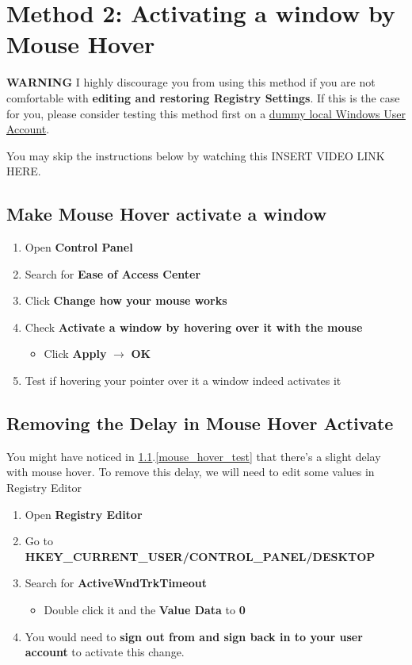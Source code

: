 \documentclass{article}
\begin{document}
\section{Method 2: Activating a window by Mouse Hover}
\label{section: method2}

\textbf{WARNING} I highly discourage you from using this method if you are not comfortable with \textbf{editing and restoring Registry Settings}. If this is the case for you, please consider testing this method first on a \href{https://support.microsoft.com/en-us/help/4026923/windows-10-create-a-local-user-or-administrator-account}{dummy local Windows User Account}. 

You may skip the instructions below by watching this INSERT VIDEO LINK HERE. 

\subsection{Make Mouse Hover activate a window}
\label{subsection: mouse_hover_enable}
\begin{enumerate}
   \item Open \textbf{Control Panel}
   \item Search for \textbf{Ease of Access Center}
   \item Click \textbf{Change how your mouse works}
   \item Check \textbf{Activate a window by hovering over it with the mouse}
   \begin{itemize}
     \item Click \textbf{Apply} $\rightarrow$ \textbf{OK}
   \end{itemize}
   \item Test if hovering your pointer over it a window indeed activates it
   \label{mouse_hover_test}
\end{enumerate}

\subsection{Removing the Delay in Mouse Hover Activate}

You might have noticed in \ref{subsection: mouse_hover_enable}.\ref{mouse_hover_test} that there's a slight delay with mouse hover. To remove this delay, we will need to edit some values in Registry Editor

\begin{enumerate}
   \item Open \textbf{Registry Editor}
   \item Go to \textbf{HKEY\_CURRENT\_USER/CONTROL\_PANEL/DESKTOP}
   \item Search for \textbf{ActiveWndTrkTimeout}
   \begin{itemize}
     \item Double click it and the \textbf{Value Data} to \textbf{0}
   \end{itemize}
   \item You would need to \textbf{sign out from and sign back in to your user account} to activate this change.
\end{enumerate}
\end{document}
